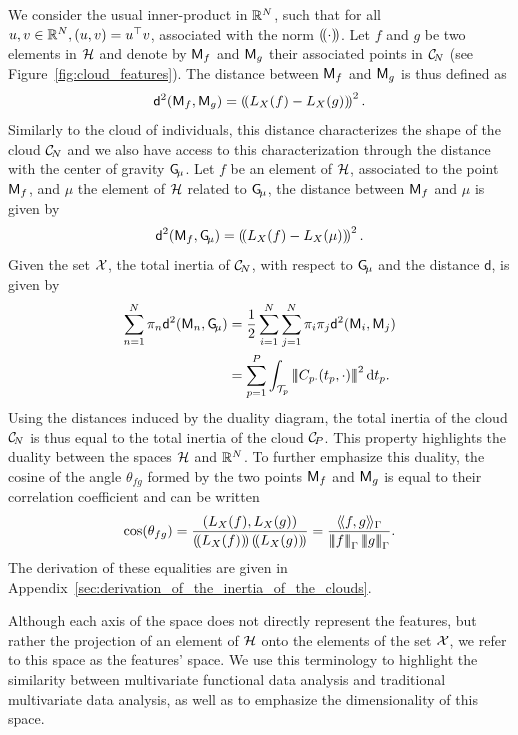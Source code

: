 We consider the usual inner-product in $\mathbb{R}^N$, such that for all $u, v \in \mathbb{R}^N, \left(u, v\right) = u^\top v$, associated with the norm $\left(\!\left(\cdot\right)\!\right)$. Let $f$ and $g$ be two elements in $\mathcal{H}$ and denote by $\mathsf{M}_f$ and $\mathsf{M}_g$ their associated points in $\mathcal{C}_{\!N}$ (see Figure~\ref{fig:cloud_features}). The distance between $\mathsf{M}_f$ and $\mathsf{M}_g$ is thus defined as
\begin{equation*}
\mathsf{d}^2(\pfea{M}_f, \pfea{M}_g) = \normR{L_X(f) - L_X(g)}^2. %
\end{equation*}
Similarly to the cloud of individuals, this distance characterizes the shape of the cloud $\mathcal{C}_{\!N}$ and we also have access to this characterization through the distance with the center of gravity $\mathsf{G}_{\!\mu}$. Let $f$ be an element of $\mathcal{H}$, associated to the point $\mathsf{M}_f$, and $\mu$ the element of $\mathcal{H}$ related to $\mathsf{G}_{\!\mu}$, the distance between $\mathsf{M}_f$ and $\mu$ is given by
\begin{equation*}
\mathsf{d}^2(\pfea{M}_f, \Gfea) = \normR{L_X(f) - L_X(\mu)}^2. %
\end{equation*}
Given the set $\mathcal{X}$, the total inertia of $\mathcal{C}_{\!N}$, with respect to $\mathsf{G}_{\!\mu}$ and the distance $\mathsf{d}$, is given by
\begin{align}\label{eq:inertia_CN}
    \sum_{n = 1}^N \pi_n \mathsf{d}^2(\pfea{M}_n, \Gfea) &= \frac{1}{2}\sum_{i = 1}^N \sum_{j = 1}^N \pi_i \pi_j \mathsf{d}^2(\pfea{M}_i, \pfea{M}_j) \\
    &= \sum_{p = 1}^P \int_{\TT{p}} \normH{C_{p \cdot}(t_p, \cdot)}^2 \dd t_p.
\end{align}
Using the distances induced by the duality diagram, the total inertia of the cloud $\mathcal{C}_{\!N}$ is thus equal to the total inertia of the cloud $\mathcal{C}_{\!P}$. This property highlights the duality between the spaces $\mathcal{H}$ and $\mathbb{R}^N$. To further emphasize this duality, the cosine of the angle $\theta_{fg}$ formed by the two points $\mathsf{M}_f$ and $\mathsf{M}_g$ is equal to their correlation coefficient and can be written
\begin{equation}
    \cos(\theta_{fg}) = \frac{\inR{L_X(f)}{L_X(g)}}{\normR{L_X(f)}\normR{L_X(g)}}
    = \frac{\inHG{f}{g}}{\normHG{f}\normHG{g}}.
\end{equation}
The derivation of these equalities are given in Appendix~\ref{sec:derivation_of_the_inertia_of_the_clouds}.

\begin{remark}
   Although each axis of the space does not directly represent the features, but rather the projection of an element of $\mathcal{H}$ onto the elements of the set $\mathcal{X}$, we refer to this space as the features' space. We use this terminology to highlight the similarity between multivariate functional data analysis and traditional multivariate data analysis, as well as to emphasize the dimensionality of this space.
\end{remark}

